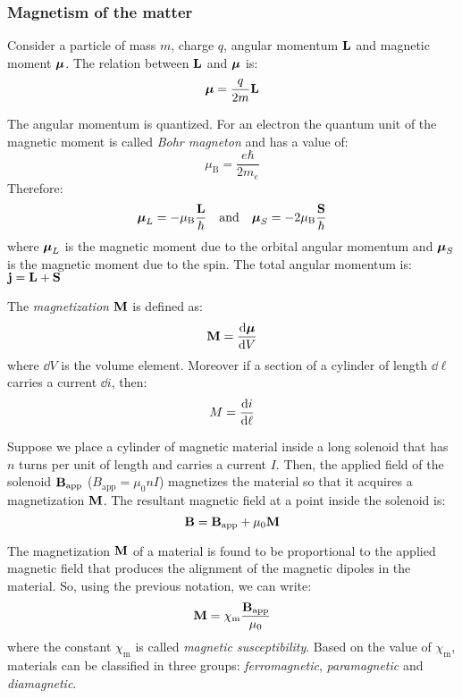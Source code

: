 \documentclass[../../../main.tex]{subfiles}
\begin{document}
\begin{multicols}{2}
  \subsubsection{Magnetism of the matter}
  \begin{prop}
    Consider a particle of mass $m$, charge $q$, angular momentum $\boldsymbol{\mathrm{L}}$ and magnetic moment $\boldsymbol{\mathrm{\mu}}$. The relation between $\boldsymbol{\mathrm{L}}$ and $\boldsymbol{\mathrm{\mu}}$ is: $$\boldsymbol{\mathrm{\mu}}=\frac{q}{2m}\boldsymbol{\mathrm{L}}$$
  \end{prop}
  \begin{prop}
    The angular momentum is quantized. For an electron the quantum unit of the magnetic moment is called \textit{Bohr magneton} and has a value of: $$\mu_\text{B}=\frac{e\hbar}{2m_e}$$ Therefore: $$\boldsymbol{\mathrm{\mu}}_L=-\mu_\text{B}\frac{\boldsymbol{\mathrm{L}}}{\hbar}\quad\text{and}\quad\boldsymbol{\mathrm{\mu}}_S=-2\mu_\text{B}\frac{\boldsymbol{\mathrm{S}}}{\hbar}$$ where $\boldsymbol{\mathrm{\mu}}_L$ is the magnetic moment due to the orbital angular momentum and $\boldsymbol{\mathrm{\mu}}_S$ is the magnetic moment due to the spin. The total angular momentum is: $\boldsymbol{\mathrm{j}}=\boldsymbol{\mathrm{L}}+\boldsymbol{\mathrm{S}}$
  \end{prop}
  \begin{definition}
    The \textit{magnetization $\boldsymbol{\mathrm{M}}$} is defined as: $$\boldsymbol{\mathrm{M}}=\dv{\boldsymbol{\mathrm{\mu}}}{V}$$ where $\dd V$ is the volume element. Moreover if a section of a cylinder of length $\dd\ell$ carries a current $\dd i$, then: $$M=\dv{i}{\ell}$$
  \end{definition}
  \begin{prop}
    Suppose we place a cylinder of magnetic material inside a long solenoid that has $n$ turns per unit of length and carries a current $I$. Then, the applied field of the solenoid $\boldsymbol{\mathrm{B}}_\text{app}$ ($B_\text{app}=\mu_0nI$) magnetizes the material so that it acquires a magnetization $\boldsymbol{\mathrm{M}}$. The resultant magnetic field at a point inside the solenoid is: $$\boldsymbol{\mathrm{B}}=\boldsymbol{\mathrm{B}}_\text{app}+\mu_0\boldsymbol{\mathrm{M}}$$
  \end{prop}
  \begin{prop}
    The magnetization $\boldsymbol{\mathrm{M}}$ of a material is found to be proportional to the applied magnetic field that produces the alignment of the magnetic dipoles in the material. So, using the previous notation, we can write: $$\boldsymbol{\mathrm{M}}=\chi_\text{m}\frac{\boldsymbol{\mathrm{B}}_\text{app}}{\mu_0}$$ where the constant $\chi_\text{m}$ is called \textit{magnetic susceptibility}. Based on the value of $\chi_\text{m}$, materials can be classified in three groups: \textit{ferromagnetic}, \textit{paramagnetic} and \textit{diamagnetic}.

\end{prop}
\end{multicols}
\end{document}
